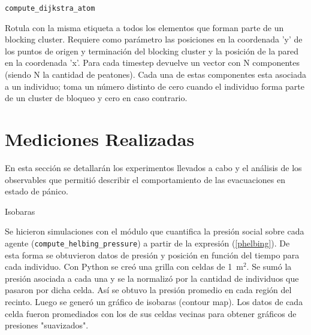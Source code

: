 

{\Large \tt {compute\_dijkstra\_atom}}

Rotula con la misma etiqueta a todos los elementos que forman parte de un blocking cluster. Requiere como parámetro las posiciones en la coordenada 'y' de los puntos de origen y terminación del blocking cluster y la posición de la pared en la coordenada 'x'. Para cada timestep devuelve un vector con N componentes (siendo N la cantidad de peatones). Cada una de estas componentes esta asociada a un individuo; toma un número distinto de cero cuando el individuo forma parte de un cluster de bloqueo y cero en caso contrario.



\section{\label{med realizadas} Mediciones Realizadas}

En esta sección se detallarán los experimentos llevados a cabo y el análisis de los observables que permitió describir el comportamiento de las evacuaciones en estado de pánico. 

{\Large Isobaras}

Se hicieron simulaciones con el módulo que cuantifica la presión social sobre cada agente ({\tt compute\_helbing\_pressure}) a partir de la expresión (\ref{phelbing}). De esta forma se obtuvieron datos de presión y posición en función del tiempo para cada individuo. Con Python se creó una grilla con celdas de 1~m$^2$. Se sumó la presión asociada a cada una y se la normalizó por la cantidad de individuos que pasaron por dicha celda. Así se obtuvo la presión promedio en cada región del recinto. Luego se generó un gráfico de isobaras (contour map). Los datos de cada celda fueron promediados con los de sus celdas vecinas para obtener gráficos de presiones "suavizados".

